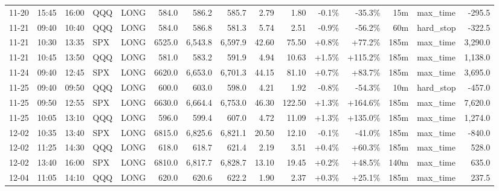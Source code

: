 \documentclass[11pt,a4paper,twoside]{article}
\begin{document}
\begin{landscape}
\begin{center}
\begin{longtable}{>{\color{txtmain}}l l l l l r r r r r r r r >{\color{txtmain}}l r}
11-20 & 15:45 & 16:00 & QQQ & LONG & 584.0 & 586.2 & 585.7 & 2.79 & 1.80 & \textcolor{lossred}{-0.1\%} & \textcolor{lossred}{-35.3\%} & 15m & max\_time & \textcolor{lossred}{-295.5} \\
11-21 & 09:40 & 10:40 & QQQ & LONG & 584.0 & 586.8 & 581.3 & 5.74 & 2.51 & \textcolor{lossred}{-0.9\%} & \textcolor{lossred}{-56.2\%} & 60m & hard\_stop & \textcolor{lossred}{-322.5} \\
11-21 & 10:30 & 13:35 & SPX & LONG & 6525.0 & 6,543.8 & 6,597.9 & 42.60 & 75.50 & \textcolor{wingreen}{+0.8\%} & \textcolor{wingreen}{+77.2\%} & 185m & max\_time & \textcolor{wingreen}{3,290.0} \\
11-21 & 10:45 & 13:50 & QQQ & LONG & 581.0 & 583.2 & 591.9 & 4.94 & 10.63 & \textcolor{wingreen}{+1.5\%} & \textcolor{wingreen}{+115.2\%} & 185m & max\_time & \textcolor{wingreen}{1,138.0} \\
11-24 & 09:40 & 12:45 & SPX & LONG & 6620.0 & 6,653.0 & 6,701.3 & 44.15 & 81.10 & \textcolor{wingreen}{+0.7\%} & \textcolor{wingreen}{+83.7\%} & 185m & max\_time & \textcolor{wingreen}{3,695.0} \\
11-25 & 09:40 & 09:50 & QQQ & LONG & 600.0 & 603.0 & 598.0 & 4.21 & 1.92 & \textcolor{lossred}{-0.8\%} & \textcolor{lossred}{-54.3\%} & 10m & hard\_stop & \textcolor{lossred}{-457.0} \\
11-25 & 09:50 & 12:55 & SPX & LONG & 6630.0 & 6,664.4 & 6,753.0 & 46.30 & 122.50 & \textcolor{wingreen}{+1.3\%} & \textcolor{wingreen}{+164.6\%} & 185m & max\_time & \textcolor{wingreen}{7,620.0} \\
11-25 & 10:05 & 13:10 & QQQ & LONG & 596.0 & 599.4 & 607.0 & 4.72 & 11.09 & \textcolor{wingreen}{+1.3\%} & \textcolor{wingreen}{+135.0\%} & 185m & max\_time & \textcolor{wingreen}{1,274.0} \\
12-02 & 10:35 & 13:40 & SPX & LONG & 6815.0 & 6,825.6 & 6,821.1 & 20.50 & 12.10 & \textcolor{lossred}{-0.1\%} & \textcolor{lossred}{-41.0\%} & 185m & max\_time & \textcolor{lossred}{-840.0} \\
12-02 & 11:25 & 14:30 & QQQ & LONG & 618.0 & 618.7 & 621.4 & 2.19 & 3.51 & \textcolor{wingreen}{+0.4\%} & \textcolor{wingreen}{+60.3\%} & 185m & max\_time & \textcolor{wingreen}{528.0} \\
12-02 & 13:40 & 16:00 & SPX & LONG & 6810.0 & 6,817.7 & 6,828.7 & 13.10 & 19.45 & \textcolor{wingreen}{+0.2\%} & \textcolor{wingreen}{+48.5\%} & 140m & max\_time & \textcolor{wingreen}{635.0} \\
12-04 & 11:05 & 14:10 & QQQ & LONG & 620.0 & 620.6 & 622.2 & 1.90 & 2.37 & \textcolor{wingreen}{+0.3\%} & \textcolor{wingreen}{+25.1\%} & 185m & max\_time & \textcolor{wingreen}{237.5} \\

\end{longtable}
\end{center}
\end{landscape}
\end{document}
